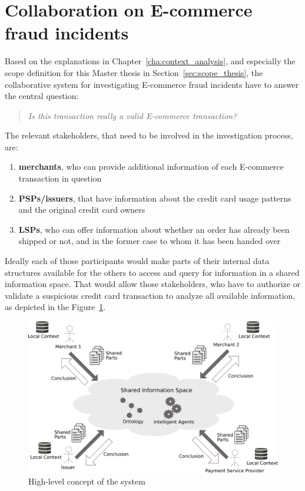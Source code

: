 
\section{Collaboration on \gls{E-commerce} fraud incidents}
\label{sec:concept_overview}

Based on the explanations in Chapter~\ref{cha:context_analysis}, and especially the scope definition for this Master thesis in Section~\ref{sec:scope_thesis}, the collaborative system for investigating \gls{E-commerce} fraud incidents have to answer the central question:\@

\begin{quotation}
  \textit{Is this transaction really a valid \gls{E-commerce} transaction?}
\end{quotation}

The relevant stakeholders, that need to be involved in the investigation process, are:\@

\begin{enumerate}
    \item \textbf{merchants}, who can provide additional information of each \gls{E-commerce} transaction in question
    \item \textbf{\gls{PSP}s/issuers}, that have information about the credit card usage patterns and the original credit card owners
    \item \textbf{\gls{LSP}s}, who can offer information about whether an order has already been shipped or not, and in the former case to whom it has been handed over
\end{enumerate}

Ideally each of those participants would make parts of their internal data structures available for the others to access and query for information in a shared information space. That would allow those stakeholders, who have to authorize or validate a suspicious credit card transaction to analyze all available information, as depicted in the Figure~\ref{fig:images_system_overview}.\@

\begin{figure}[H]
	\centering
		\includegraphics[width=0.9\columnwidth]{images/system_overview.pdf}
	\caption{High-level concept of the system}
\label{fig:images_system_overview}
\end{figure}

